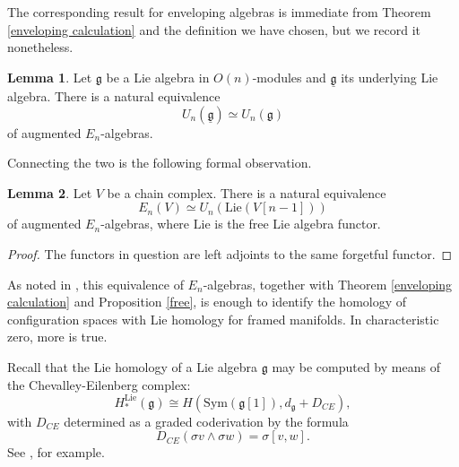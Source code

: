 \documentclass{compositio}
\theoremstyle{definition}\newtheorem{definition}{Definition}[section]
\theoremstyle{theorem}\newtheorem{lemma}[definition]{Lemma}
\theoremstyle{remark}\newtheorem*{conventions}{Conventions}
\theoremstyle{remark}\newtheorem*{acknowledgments}{Acknowledgments}
\theoremstyle{remark}\newtheorem*{outline}{Outline}
\theoremstyle{remark}\newtheorem*{questions}{Questions}
\theoremstyle{remark}\newtheorem{example}[definition]{Example}
\theoremstyle{definition}\newtheorem{construction}[definition]{Construction}
\theoremstyle{definition}\newtheorem*{convention}{Convention}
\theoremstyle{definition}\newtheorem*{conjecture}{Conjecture}
\theoremstyle{theorem}\newtheorem{theorem}[definition]{Theorem}
\theoremstyle{theorem}\newtheorem{paradigm}[definition]{Paradigm}
\theoremstyle{remark}\newtheorem{remark}[definition]{Remark}
\theoremstyle{corollary}\newtheorem{corollary}[definition]{Corollary}
\theoremstyle{theorem}\newtheorem{proposition}[definition]{Proposition}
\theoremstyle{definition}\newtheorem{question}[definition]{Question}
\begin{document}
The corresponding result for enveloping algebras is immediate from Theorem \ref{enveloping calculation} and the definition we have chosen, but we record it nonetheless.

\begin{lemma}
Let $\mathfrak{g}$ be a Lie algebra in $O(n)$-modules and $\underline{\mathfrak{g}}$ its underlying Lie algebra. There is a natural equivalence $$U_n(\underline{\mathfrak{g}})\simeq U_n(\mathfrak{g})$$ of augmented $E_n$-algebras.
\end{lemma}

Connecting the two is the following formal observation.

\begin{lemma}
Let $V$ be a chain complex. There is a natural equivalence $$E_n(V)\simeq U_n({\mathrm{Lie}}(V[n-1]))$$ of augmented $E_n$-algebras, where ${\mathrm{Lie}}$ is the free Lie algebra functor.
\end{lemma}
\begin{proof}
The functors in question are left adjoints to the same forgetful functor.
\end{proof}

As noted in \cite{Francis}, this equivalence of $E_n$-algebras, together with Theorem \ref{enveloping calculation} and Proposition \ref{free}, is enough to identify the homology of configuration spaces with Lie homology for framed manifolds. In characteristic zero, more is true.

Recall that the Lie homology of a Lie algebra $\mathfrak{g}$ may be computed by means of the Chevalley-Eilenberg complex: $$H_*^{\mathrm{Lie}}(\mathfrak{g})\cong H({\mathrm{Sym}}(\mathfrak{g}[1]), d_\mathfrak{g}+D_{CE}),$$ with $D_{CE}$ determined as a graded coderivation by the formula $$D_{CE}(\sigma v\wedge \sigma w)=\sigma [v,w].$$ See \cite{FHT}, for example.
\end{document}
